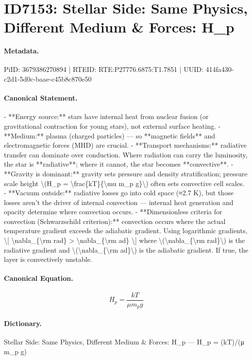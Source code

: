 \section*{ID7153: Stellar Side: Same Physics, Different Medium \& Forces: H\_p}
\paragraph{Metadata.}
PiID: 3679386270894 | RTEID: RTE:P27776.6875:T1.7851 | UUID: 414fa430-c2d1-5d0c-baae-c45b8c870e50

\paragraph{Canonical Statement.}
- **Energy source:** stars have internal heat from nuclear fusion (or gravitational contraction for young stars), not external surface heating. - **Medium:** plasma (charged particles) — so **magnetic fields** and electromagnetic forces (MHD) are crucial. - **Transport mechanisms:** radiative transfer can dominate over conduction. Where radiation can carry the luminosity, the star is **radiative**; where it cannot, the star becomes **convective**. - **Gravity is dominant:** gravity sets pressure and density stratification; pressure scale height \textbackslash{}(H\_p = \textbackslash{}frac\{kT\}\{\textbackslash{}mu m\_p g\}\textbackslash{}) often sets convective cell scales. - **Vacuum outside:** radiative losses go into cold space (≈2.7 K), but those losses aren’t the driver of internal convection — internal heat generation and opacity determine where convection occurs. - **Dimensionless criteria for convection (Schwarzschild criterion):** convection occurs where the actual temperature gradient exceeds the adiabatic gradient. Using logarithmic gradients, \textbackslash{}[ \textbackslash{}nabla\_\{\textbackslash{}rm rad\} > \textbackslash{}nabla\_\{\textbackslash{}rm ad\} \textbackslash{}] where \textbackslash{}(\textbackslash{}nabla\_\{\textbackslash{}rm rad\}\textbackslash{}) is the radiative gradient and \textbackslash{}(\textbackslash{}nabla\_\{\textbackslash{}rm ad\}\textbackslash{}) is the adiabatic gradient. If true, the layer is convectively unstable.

\paragraph{Canonical Equation.}
\[
H_p = \frac{kT}{\mu m_p g}
\]

\paragraph{Dictionary.}
Stellar Side: Same Physics, Different Medium \& Forces: H\_p — H\_p = (kT)/(μ m\_p g)

